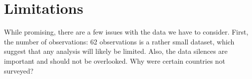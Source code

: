 \documentclass[
]{article}
\begin{document}
\hypertarget{limitations}{%
\section{Limitations}\label{limitations}}

While promising, there are a few issues with the data we have to
consider. First, the number of observations: 62 observations is a rather
small dataset, which suggest that any analysis will likely be limited.
Also, the data silences are important and should not be overlooked. Why
were certain countries not surveyed?
\end{document}
